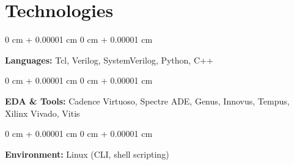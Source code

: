 \documentclass[10pt, letterpaper]{article}
\newenvironment{onecolentry}{
    \begin{adjustwidth}{
        0 cm + 0.00001 cm
    }{
        0 cm + 0.00001 cm
    }
}{
    \end{adjustwidth}
} %
\begin{document}
        
\section{Technologies}

\begin{onecolentry}
    \textbf{Languages:} Tcl, Verilog, SystemVerilog, Python, C++
\end{onecolentry}

\vspace{0.1 cm}

\begin{onecolentry}
    \textbf{EDA \& Tools:} Cadence Virtuoso, Spectre ADE, Genus, Innovus, Tempus, Xilinx Vivado, Vitis
\end{onecolentry}

\vspace{0.1 cm}

\begin{onecolentry}
    \textbf{Environment:} Linux (CLI, shell scripting)
\end{onecolentry}
\end{document}
